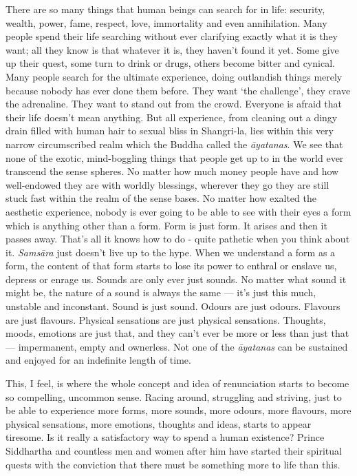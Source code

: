 There are so many things that human beings can search for in life:
security, wealth, power, fame, respect, love, immortality and even
annihilation. Many people spend their life searching without ever
clarifying exactly what it is they want; all they know is that whatever
it is, they haven't found it yet. Some give up their quest, some turn to
drink or drugs, others become bitter and cynical. Many people search for
the ultimate experience, doing outlandish things merely because nobody
has ever done them before. They want `the challenge', they crave the
adrenaline. They want to stand out from the crowd. Everyone is afraid
that their life doesn't mean anything. But all experience, from cleaning
out a dingy drain filled with human hair to sexual bliss in Shangri-la,
lies within this very narrow circumscribed realm which the Buddha called
the \emph{āyatanas}. We see that none of the exotic, mind-boggling
things that people get up to in the world ever transcend the sense
spheres. No matter how much money people have and how well-endowed they
are with worldly blessings, wherever they go they are still stuck fast
within the realm of the sense bases. No matter how exalted the aesthetic
experience, nobody is ever going to be able to see with their eyes a
form which is anything other than a form. Form is just form. It arises
and then it passes away. That's all it knows how to do - quite pathetic
when you think about it. \emph{Samsāra} just doesn't live up to the
hype. When we understand a form as a form, the content of that form
starts to lose its power to enthral or enslave us, depress or enrage us.
Sounds are only ever just sounds. No matter what sound it might be, the
nature of a sound is always the same --- it's just this much, unstable
and inconstant. Sound is just sound. Odours are just odours. Flavours
are just flavours. Physical sensations are just physical sensations.
Thoughts, moods, emotions are just that, and they can't ever be more or
less than just that --- impermanent, empty and ownerless. Not one of the
\emph{āyatanas} can be sustained and enjoyed for an indefinite length of
time.

This, I feel, is where the whole concept and idea of renunciation starts
to become so compelling, uncommon sense. Racing around, struggling and
striving, just to be able to experience more forms, more sounds, more
odours, more flavours, more physical sensations, more emotions, thoughts
and ideas, starts to appear tiresome. Is it really a satisfactory way to
spend a human existence? Prince Siddhartha and countless men and women
after him have started their spiritual quests with the conviction that
there must be something more to life than this.

